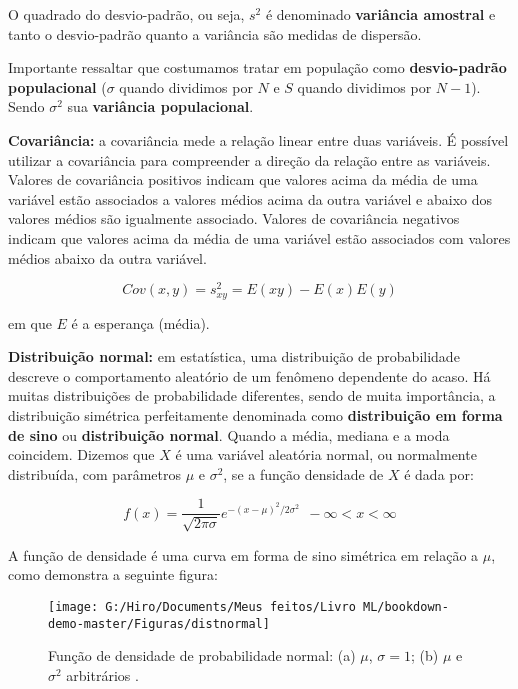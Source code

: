 \documentclass[
  openany]{book}
\begin{document}
O quadrado do desvio-padrão, ou seja, \(s^2\) é denominado \textbf{variância amostral} e tanto o desvio-padrão quanto a variância são medidas de dispersão.

Importante ressaltar que costumamos tratar em população como \textbf{desvio-padrão populacional} (\(\sigma\) quando dividimos por \(N\) e \(S\) quando dividimos por \(N-1\)). Sendo \(\sigma^2\) sua \textbf{variância populacional}.

\textbf{Covariância:} a covariância mede a relação linear entre duas variáveis. É possível utilizar a covariância para compreender a direção da relação entre as variáveis. Valores de covariância positivos indicam que valores acima da média de uma variável estão associados a valores médios acima da outra variável e abaixo dos valores médios são igualmente associado. Valores de covariância negativos indicam que valores acima da média de uma variável estão associados com valores médios abaixo da outra variável.

\begin{equation}
    Cov(x,y)=s^2_{xy}=E(xy)-E(x)E(y)
    \label{eq:covariancia}
\end{equation}

em que \(E\) é a esperança (média).

\textbf{Distribuição normal:} em estatística, uma distribuição de probabilidade descreve o comportamento aleatório de um fenômeno dependente do acaso. Há muitas distribuições de probabilidade diferentes, sendo de muita importância, a distribuição simétrica perfeitamente denominada como \textbf{distribuição em forma de sino} ou \textbf{distribuição normal}. Quando a média, mediana e a moda coincidem. Dizemos que \(X\) é uma variável aleatória normal, ou normalmente distribuída, com parâmetros \(\mu\) e \(\sigma^2\), se a função densidade de \(X\) é dada por:

\begin{equation}
    f(x)=\frac{1}{\sqrt{2\pi \sigma}}e^{-(x-\mu)^2/2\sigma^2} \ \ -\infty<x<\infty
    \label{eq:fnormal}
\end{equation}

A função de densidade é uma curva em forma de sino simétrica em relação a \(\mu\), como demonstra a seguinte figura:

\begin{figure}

{\centering \texttt{[image: G:/Hiro/Documents/Meus feitos/Livro ML/bookdown-demo-master/Figuras/distnormal]} 

}

\caption{Função de densidade de probabilidade normal: (a) \(\mu\), \(\sigma=1\); (b) \(\mu\) e \(\sigma^2\) arbitrários \citep{rossprobability}.}\label{fig:distnormal}
\end{figure}
\end{document}
